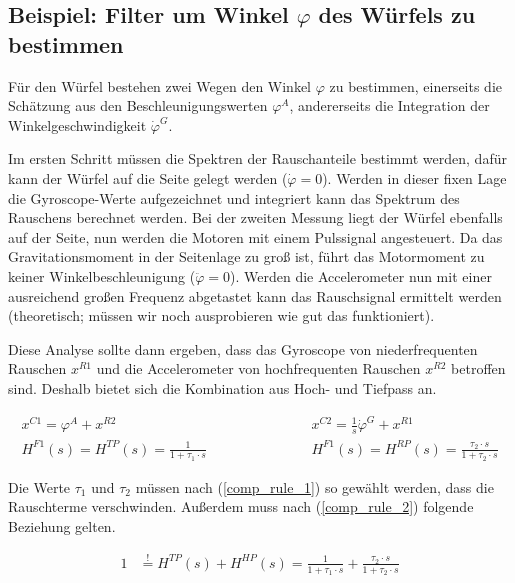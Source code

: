 \documentclass{article}
\begin{document}
\subsection{Beispiel: Filter um Winkel $\varphi$ des Würfels zu bestimmen}
Für den Würfel bestehen zwei Wegen den Winkel $\varphi$ zu bestimmen, einerseits die Schätzung aus den Beschleunigungswerten $\varphi^A$, andererseits die Integration der Winkelgeschwindigkeit $\dot{\varphi}^G$.

Im ersten Schritt müssen die Spektren der Rauschanteile bestimmt werden, dafür kann der Würfel auf die Seite gelegt werden ($\dot{\varphi} = 0$). Werden in dieser fixen Lage die Gyroscope-Werte aufgezeichnet und integriert kann das Spektrum des Rauschens berechnet werden. 
Bei der zweiten Messung liegt der Würfel ebenfalls auf der Seite, nun werden die Motoren mit einem Pulssignal angesteuert. Da das Gravitationsmoment in der Seitenlage zu groß ist, führt das Motormoment zu keiner Winkelbeschleunigung ($\ddot{\varphi}=0$). Werden die Accelerometer nun mit einer ausreichend großen Frequenz abgetastet kann das Rauschsignal ermittelt werden (theoretisch; müssen wir noch ausprobieren wie gut das funktioniert).

Diese Analyse sollte dann ergeben, dass das Gyroscope von niederfrequenten Rauschen $x^{R1}$ und die Accelerometer von hochfrequenten Rauschen $x^{R2}$ betroffen sind. Deshalb bietet sich die Kombination aus Hoch- und Tiefpass an.

\begin{equation}
\begin{split}
x^{C1} = \varphi^A + x^{R2} \hspace{80pt} & x^{C2} = \frac{1}{s} \dot{\varphi}^G + x^{R1}  \\
H^{F1}(s) = H^{TP}(s) = \frac{1}{1 + \tau_1 \cdot s} \hspace{80pt} & H^{F1}(s)=H^{RP}(s) = \frac{\tau_2 \cdot s}{1 + \tau_2 \cdot s}
\end{split}
\end{equation}

Die Werte $\tau_1$ und $\tau_2$ müssen nach (\ref{comp_rule_1}) so gewählt werden, dass die Rauschterme verschwinden. Außerdem muss nach (\ref{comp_rule_2}) folgende Beziehung gelten.

\begin{equation}
\begin{split}
1 & \overset{!}{=}  H^{TP}(s) + H^{HP}(s) = \frac{1}{1 + \tau_1 \cdot s} + \frac{\tau_2 \cdot s}{1 + \tau_2 \cdot s}
\end{split}
\end{equation}
\end{document}
